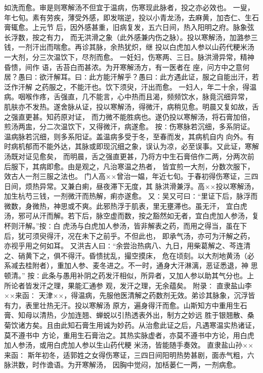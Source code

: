 \documentclass[a4paper,12pt,UTF8,twoside]{ctexbook}
\begin{document}
如洗而愈。审是则寒解汤不但宜于温病，伤寒现此脉者，投之亦必效也。 
一叟，年七旬。素有劳疾，薄受外感，即发喘逆，投以小青龙汤，去麻黄，加杏仁、生石膏辄愈。上元节 
后，因外感甚重，旧病复发，五六日间，热入阳明之府。脉象弦长浮数，按之有力， 
而无洪滑之象（此外感兼内伤之脉）。投以寒解汤，加潞参三钱，一剂汗出而喘愈。再诊其脉，余热犹炽，继 
投以白虎加人参以山药代粳米汤一大剂，分三次温饮下，尽剂而愈。 
一妊妇，伤寒两、三日。脉洪滑异常，精神昏愦，间作 语，舌苔白而甚浓。为开寒解汤方，有一医者在 
座，问方中之意何居？愚曰∶欲汗解耳。曰∶此方能汗解乎？愚曰∶此方遇此证，服之自能出汗，若泛作汗解 
之药服之，不能汗也。饮下须臾，汗出而愈。 
一妇人，年二十余，得温病。咽喉作疼，舌强直，几不能言，心中热而且渴，频频饮水，脉竟沉细异常， 
肌肤亦不发热。遂舍脉从证，投以寒解汤，得微汗，病稍见愈。明晨又复如故，舌之强直更甚。知药原对证， 
而力微不能胜病也。遂仍投以寒解汤，将石膏加倍，煎汤两盅，分二次温饮下，又得微汗，病遂愈。 
按∶伤寒脉若沉细，多系阴证。温病脉若沉细，则多系阳证。盖温病多受于冬，至春而发，其病机自内 
向外。有时病机郁而不能外达，其脉或即现沉细之象，误认为凉，必至误事。又此证，寒解汤既对证见愈矣， 
而明晨，舌之强直更甚，乃将方中生石膏倍作二两，分两次前后服下，其病即愈。由是观之，凡治寒温之热者， 
皆宜煎一大剂，分数次服下，效古人一剂三服之法也。 
门人高××曾治一媪，年近七旬。于春初得伤寒证，三四日间，烦热异常。又兼白痢，昼夜滞下无度，其 
脉洪滑兼浮。高××投以寒解汤，加生杭芍三钱，一剂微汗而热解，痢亦遂愈。 
又∶吴又可曰∶“里证下后，脉浮而微数，身微热，神思或不爽。此邪热浮于肌表，里无壅滞也。虽无汗， 
宜白虎汤，邪可从汗而解。若下后，脉空虚而数，按之豁然如无者，宜白虎加人参汤，复杯则汗解。”按∶白 
虎汤与白虎加人参汤，皆非解表之药，而用之得当，虽在下后，犹可须臾得汗，况在未下之前乎。不但此也， 
即承气汤，亦可为汗解之药，亦视乎用之何如耳。 
又洪吉人曰∶“余尝治热病八、九日，用柴葛解之、芩连清之、硝黄下之，俱不得汗。昏愦扰乱，撮空摸床， 
危在顷刻。以大剂地黄汤（必系减去桂附者），重加人参、麦冬进之。不一时，通身大汗淋漓，恶证悉退，神 
思顿清。” 
按∶此条与愚用补阴之药发汗相似，所异者，又加人参以助其气分也。上所论者皆发汗之理，果能汇通参 
观，发汗之理，无余蕴矣。 
附录∶ 
直隶盐山李××来函∶ 
天津××，得温病，先服他医清解之药数剂无效。弟诊其脉象，沉浮皆有力，表里壮热无汗。投以寒解汤 
原方，遍身得汗而愈。山斯知方中重用生石膏、知母以清热，少加连翘、蝉蜕以引热透表外出，制方之妙远 
胜于银翘散、桑菊饮诸方矣。且由此知石膏生用诚为妙药。从治愈此证之后，凡遇寒温实热诸证，莫不遵书中 
方论，重用生石膏治之。其热实脉虚者，亦莫不遵书中方论，用白虎加人参汤，或用白虎加人参以生山药代粳 
米汤，皆能随手奏效。 
直隶盐山孙××来函∶ 
斯年初冬，适郭姓之女得伤寒证，三四日间阳明热势甚剧，面赤气粗，六脉洪数，时作谵语。为开寒解汤， 
因胸中觉闷，加栝蒌仁一两，一剂病愈。 
\end{document}
